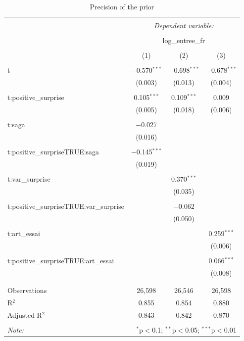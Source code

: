 \begin{table}[!htbp] \centering 
	\caption{Precision of the prior} 
	\label{} 
	\begin{tabular}{@{\extracolsep{5pt}}lccc} 
		\\[-1.8ex]\hline 
		\hline \\[-1.8ex] 
		& \multicolumn{3}{c}{\textit{Dependent variable:}} \\ 
		\cline{2-4} 
		\\[-1.8ex] & \multicolumn{3}{c}{log\_entree\_fr} \\ 
		\\[-1.8ex] & (1) & (2) & (3)\\ 
		\hline \\[-1.8ex] 
		t & $-$0.570$^{***}$ & $-$0.698$^{***}$ & $-$0.678$^{***}$ \\ 
		& (0.003) & (0.013) & (0.004) \\ 
		& & & \\ 
		t:positive\_surprise & 0.105$^{***}$ & 0.109$^{***}$ & 0.009 \\ 
		& (0.005) & (0.018) & (0.006) \\ 
		& & & \\ 
		t:saga & $-$0.027 &  &  \\ 
		& (0.016) &  &  \\ 
		& & & \\ 
		t:positive\_surpriseTRUE:saga & $-$0.145$^{***}$ &  &  \\ 
		& (0.019) &  &  \\ 
		& & & \\ 
		t:var\_surprise &  & 0.370$^{***}$ &  \\ 
		&  & (0.035) &  \\ 
		& & & \\ 
		t:positive\_surpriseTRUE:var\_surprise &  & $-$0.062 &  \\ 
		&  & (0.050) &  \\ 
		& & & \\ 
		t:art\_essai &  &  & 0.259$^{***}$ \\ 
		&  &  & (0.006) \\ 
		& & & \\ 
		t:positive\_surpriseTRUE:art\_essai &  &  & 0.066$^{***}$ \\ 
		&  &  & (0.008) \\ 
		& & & \\ 
		\hline \\[-1.8ex] 
		Observations & 26,598 & 26,546 & 26,598 \\ 
		R$^{2}$ & 0.855 & 0.854 & 0.880 \\ 
		Adjusted R$^{2}$ & 0.843 & 0.842 & 0.870 \\ 
		\hline 
		\hline \\[-1.8ex] 
		\textit{Note:}  & \multicolumn{3}{r}{$^{*}$p$<$0.1; $^{**}$p$<$0.05; $^{***}$p$<$0.01} \\ 
	\end{tabular} 
\end{table} 

